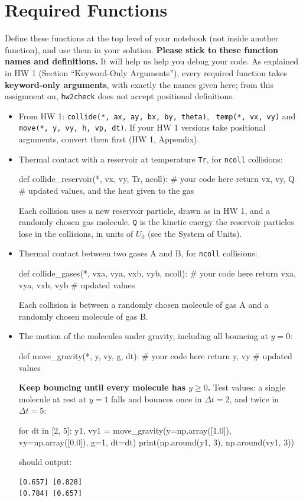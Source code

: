 \documentclass[12pt]{article}
\begin{document}
\section{Required Functions}

\noindent
Define these functions at the top level of your notebook (not inside
another function), and use them in your solution.  {\bf Please stick to
these function names and definitions.}  It will help us help you debug
your code.  As explained in HW 1 (Section ``Keyword-Only Arguments''),
every required function takes {\bf keyword-only arguments}, with exactly
the names given here; from this assignment on, {\tt hw2check} does not
accept positional definitions.
\begin{itemize}
\item From HW 1: {\tt collide(*, ax, ay, bx, by, theta)}, {\tt
  temp(*, vx, vy)} and {\tt move(*, y, vy, h, vp, dt)}.  If your HW 1
  versions take positional arguments, convert them first (HW 1, Appendix).
\item Thermal contact with a reservoir at temperature {\tt Tr}, for {\tt ncoll} collisions:
\begin{python}
def collide_reservoir(*, vx, vy, Tr, ncoll):
    # your code here
    return vx, vy, Q # updated values, and the heat given to the gas
\end{python}
  Each collision uses a new reservoir particle, drawn as in HW 1, and
  a randomly chosen gas molecule.  {\tt Q} is the kinetic energy the
  reservoir particles lose in the collisions, in units of $U_0$ (see
  the System of Units).
\item Thermal contact between two gases A and B, for {\tt ncoll} collisions:
\begin{python}
def collide_gases(*, vxa, vya, vxb, vyb, ncoll):
    # your code here
    return vxa, vya, vxb, vyb # updated values
\end{python}
  Each collision is between a randomly chosen molecule of gas A and a
  randomly chosen molecule of gas B.
\item The motion of the molecules under gravity, including all bouncing at $y=0$:
\begin{python}
def move_gravity(*, y, vy, g, dt):
    # your code here
    return y, vy # updated values
\end{python}
  {\bf Keep bouncing until every molecule has $y \ge 0$.}  Test
  values: a single molecule at rest at $y=1$ falls and bounces once in
  $\Delta t = 2$, and twice in $\Delta t = 5$:
\begin{python}
for dt in [2, 5]:
    y1, vy1 = move_gravity(y=np.array([1.0]), vy=np.array([0.0]), g=1, dt=dt)
    print(np.around(y1, 3), np.around(vy1, 3))
\end{python}
  should output:
\begin{verbatim}
[0.657] [0.828]
[0.784] [0.657]
\end{verbatim}
\end{itemize}
\end{document}
